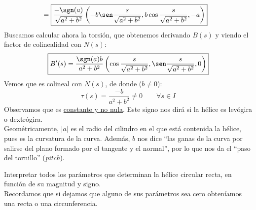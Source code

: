 \begin{ejemplo}
\begin{align*}
                 &=\boxed{ \frac{-\sgn(a)}{\sqrt{a^2+b^2}}\left(-b\sen \frac{s}{\sqrt{a^2+b^2}}, b\cos\frac{s}{\sqrt{a^2+b^2}}, -a\right)}
        \end{align*}
        Buscamos calcular ahora la torsión, que obtenemos derivando $B(s)$ y viendo el factor de colinealidad con $N(s)$:
        \begin{equation*}
            \boxed{B'(s) = \frac{\sgn(a)b}{a^2+b^2}\left(\cos \frac{s}{\sqrt{a^2+b^2}}, \sen\frac{s}{\sqrt{a^2+b^2}},0\right)}
        \end{equation*}
        Vemos que es colineal con $N(s)$, de donde ($b \neq 0$):
        \begin{equation*}
            \boxed{\tau(s) = \frac{-b}{a^2+b^2}} \neq 0 \qquad \forall s\in I
        \end{equation*}
        Observamos que es \underline{constante y no nula}. Este signo nos dirá si la hélice es levógira o dextrógira.\\

        \noindent
        Geométricamente, $|a|$ es el radio del cilindro en el que está contenida la hélice, pues es la curvatura de la curva. Además, $b$ nos dice ``las ganas de la curva por salirse del plano formado por el tangente y el normal'', por lo que nos da el ``paso del tornillo'' (\textit{pitch}).
\end{ejemplo}

\begin{ejercicio}
    Interpretar todos los parámetros que determinan la hélice circular recta, en función de su magnitud y signo.\\

    \noindent
    Recordamos que si dejamos que alguno de sus parámetros sea cero obteníamos una recta o una circunferencia.
\end{ejercicio}

